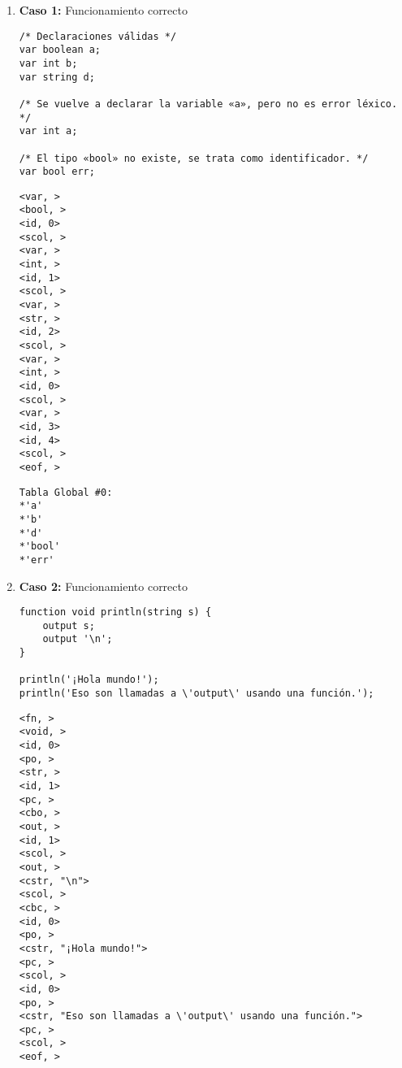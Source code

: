 \documentclass{article}
\begin{document}
\begin{enumerate}

    \item \textbf{Caso 1:} Funcionamiento correcto
    \begin{tcolorbox}[title={Código fuente}, colback=white]
        \begin{lstlisting}
/* Declaraciones válidas */
var boolean a;
var int b;
var string d;

/* Se vuelve a declarar la variable «a», pero no es error léxico. */
var int a;

/* El tipo «bool» no existe, se trata como identificador. */
var bool err;
        \end{lstlisting}
    \end{tcolorbox}

    \begin{tcolorbox}[title={Volcado del fichero de tokens}, colback=white]
        \begin{lstlisting}
<var, >
<bool, >
<id, 0>
<scol, >
<var, >
<int, >
<id, 1>
<scol, >
<var, >
<str, >
<id, 2>
<scol, >
<var, >
<int, >
<id, 0>
<scol, >
<var, >
<id, 3>
<id, 4>
<scol, >
<eof, >
        \end{lstlisting}
    \end{tcolorbox}

    \begin{tcolorbox}[title={Volcado del fichero de la tabla de símbolos}, colback=white]
        \begin{lstlisting}
Tabla Global #0:
*'a'
*'b'
*'d'
*'bool'
*'err'
        \end{lstlisting}
    \end{tcolorbox}


    \item \textbf{Caso 2:} Funcionamiento correcto
    \begin{tcolorbox}[title={Código fuente}, colback=white]
        \begin{lstlisting}
function void println(string s) {
    output s;
    output '\n';
}

println('¡Hola mundo!');
println('Eso son llamadas a \'output\' usando una función.');
        \end{lstlisting}
    \end{tcolorbox}

    \begin{tcolorbox}[title={Volcado del fichero de tokens}, colback=white]
        \begin{lstlisting}
<fn, >
<void, >
<id, 0>
<po, >
<str, >
<id, 1>
<pc, >
<cbo, >
<out, >
<id, 1>
<scol, >
<out, >
<cstr, "\n">
<scol, >
<cbc, >
<id, 0>
<po, >
<cstr, "¡Hola mundo!">
<pc, >
<scol, >
<id, 0>
<po, >
<cstr, "Eso son llamadas a \'output\' usando una función.">
<pc, >
<scol, >
<eof, >
        \end{lstlisting}
    \end{tcolorbox}


\end{enumerate}
\end{document}
